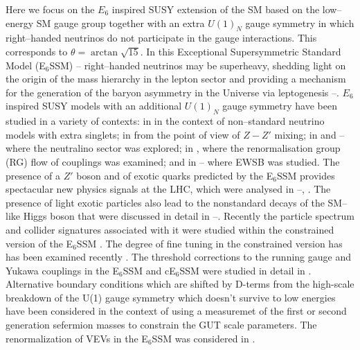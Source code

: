 \documentclass[12pt,a4paper]{article}
\begin{document}
Here we focus on the $E_6$ inspired SUSY extension of the SM based on
the low--energy SM gauge group together with an extra $U(1)_{N}$ gauge
symmetry in which right--handed neutrinos do not participate in the
gauge interactions. This corresponds to $\theta=\arctan\sqrt{15}$.
In this Exceptional Supersymmetric Standard Model (E$_6$SSM)
\cite{King:2005jy}--\cite{King:2005my} right--handed neutrinos may be
superheavy, shedding light on the origin of the mass hierarchy in the
lepton sector and providing a mechanism for the generation of the
baryon asymmetry in the Universe via leptogenesis
\cite{Hambye:2000bn}--\cite{King:2008qb}. $E_6$ inspired SUSY models
with an additional $U(1)_{N}$ gauge symmetry have been studied in
a variety of contexts:
in \cite{Ma:1995xk} in the context of non--standard neutrino models with
extra singlets; in \cite{Suematsu:1997au} from the point of view of
$Z-Z'$ mixing; in \cite{Keith:1997zb} and
\cite{Suematsu:1997au}--\cite{Keith:1996fv} where the neutralino
sector was explored; in \cite{Keith:1997zb}, \cite{King:2007uj} where
the renormalisation group (RG) flow of couplings was examined; and in
\cite{Suematsu:1994qm}--\cite{Daikoku:2000ep} where EWSB was
studied. The presence of a $Z'$ boson and of exotic quarks predicted
by the E$_6$SSM provides spectacular new physics signals at the LHC,
which were analysed in \cite{King:2005jy}--\cite{Accomando:2006ga},
\cite{Howl:2007zi}. The presence of light exotic particles also lead
to the nonstandard decays of the SM--like Higgs boson that were
discussed in detail in \cite{Nevzorov:2013tta}--\cite{Hall:2010ix}.
Recently the particle spectrum and collider signatures associated with
it were studied within the constrained version of the E$_6$SSM
\cite{cE6SSM}. The degree of fine tuning in the constrained version 
has has been examined recently \cite{Athron:2013ipa}. The threshold 
corrections to the running gauge and
Yukawa couplings in the E$_6$SSM and cE$_6$SSM were studied in detail
in \cite{Athron:2012pw}. Alternative boundary conditions which are shifted by D-terms from the high-scale breakdown of the U(1) gauge symmetry which doesn't survive to low energies have been considered in the context of using a measuremet of the first or second generation sefermion masses to constrain the GUT scale parameters\cite{Miller:2012vn}. The renormalization of VEVs in the E$_6$SSM
was considered in \cite{Sperling:2013eva}.
\end{document}
